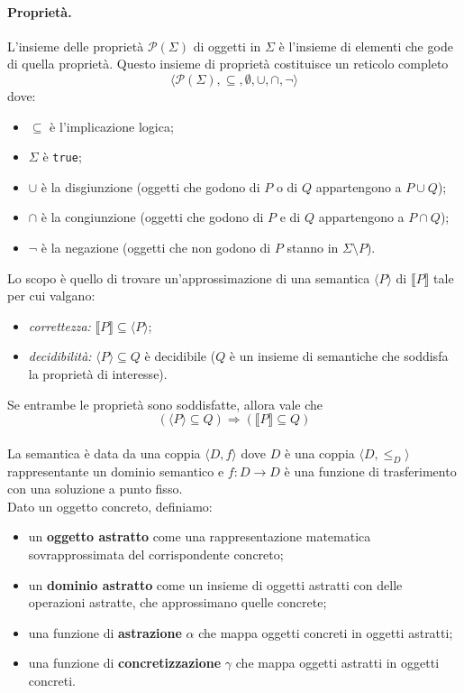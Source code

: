 \documentclass{article}
\newcommand{\parts}[1]{\mathcal{P}(#1)}
\begin{document}
        \paragraph{Proprietà.} L'insieme delle proprietà $\parts{\Sigma}$ di oggetti in $\Sigma$ è l'insieme di elementi che gode di quella proprietà. Questo insieme di proprietà costituisce un reticolo completo \[ \langle \parts{\Sigma}, \subseteq, \emptyset, \cup, \cap, \neg \rangle \] dove:
        \begin{itemize}
            \item $\subseteq$ è l'implicazione logica;
            \item $\Sigma$ è \verb|true|;
            \item $\cup$ è la disgiunzione (oggetti che godono di $P$ o di $Q$ appartengono a $P \cup Q$);
            \item $\cap$ è la congiunzione (oggetti che godono di $P$ e di $Q$ appartengono a $P \cap Q$);
            \item $\neg$ è la negazione (oggetti che non godono di $P$ stanno in $\Sigma \setminus P$).
        \end{itemize}
        Lo scopo è quello di trovare un'approssimazione di una semantica $\langle P \rangle$ di $\llbracket P \rrbracket$ tale per cui valgano:
        \begin{itemize}
            \item \textit{correttezza:} $\llbracket P \rrbracket \subseteq \langle P \rangle$;
            \item \textit{decidibilità:} $\langle P \rangle \subseteq Q$ è decidibile ($Q$ è un insieme di semantiche che soddisfa la proprietà di interesse).
        \end{itemize}
        Se entrambe le proprietà sono soddisfatte, allora vale che \[ (\langle P \rangle \subseteq Q) \Rightarrow (\llbracket P \rrbracket \subseteq Q) \]\\  
        La semantica è data da una coppia $\langle D, f \rangle$ dove $D$ è una coppia $\langle D, \leq_D \rangle$ rappresentante un dominio semantico e $f: D \to D$ è una funzione di trasferimento con una soluzione a punto fisso.\\
        Dato un oggetto concreto, definiamo:
        \begin{itemize}
            \item un \textbf{oggetto astratto} come una rappresentazione matematica sovrapprossimata del corrispondente concreto;
            \item un \textbf{dominio astratto} come un insieme di oggetti astratti con delle operazioni astratte, che approssimano quelle concrete;
            \item una funzione di \textbf{astrazione} $\alpha$ che mappa oggetti concreti in oggetti astratti;
            \item una funzione di \textbf{concretizzazione} $\gamma$ che mappa oggetti astratti in oggetti concreti.
        \end{itemize}   
\end{document}
